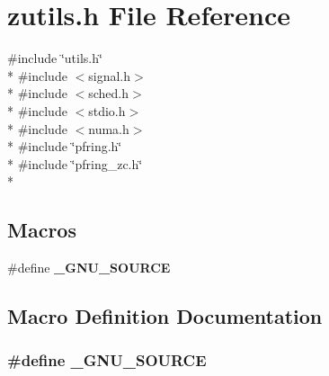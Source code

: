 \section{zutils.\+h File Reference}
\label{zutils_8h}
{\ttfamily \#include \char`\"{}utils.\+h\char`\"{}}\\*
{\ttfamily \#include $<$signal.\+h$>$}\\*
{\ttfamily \#include $<$sched.\+h$>$}\\*
{\ttfamily \#include $<$stdio.\+h$>$}\\*
{\ttfamily \#include $<$numa.\+h$>$}\\*
{\ttfamily \#include \char`\"{}pfring.\+h\char`\"{}}\\*
{\ttfamily \#include \char`\"{}pfring\+\_\+zc.\+h\char`\"{}}\\*
\subsection*{Macros}
\begin{DoxyCompactItemize}
\item 
\#define {\bf \+\_\+\+G\+N\+U\+\_\+\+S\+O\+U\+R\+C\+E}
\end{DoxyCompactItemize}


\subsection{Macro Definition Documentation}
\subsubsection[{\+\_\+\+G\+N\+U\+\_\+\+S\+O\+U\+R\+C\+E}]{\setlength{\rightskip}{0pt plus 5cm}\#define \+\_\+\+G\+N\+U\+\_\+\+S\+O\+U\+R\+C\+E}\label{zutils_8h_a369266c24eacffb87046522897a570d5}
